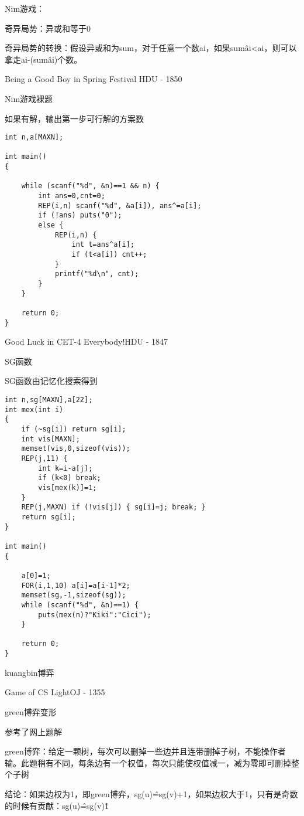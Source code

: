 Nim游戏：

奇异局势：异或和等于0

奇异局势的转换：假设异或和为sum，对于任意一个数ai，如果sum\^ai<ai，则可以拿走ai-(sum\^ai)个数。

Being a Good Boy in Spring Festival HDU - 1850

Nim游戏裸题

如果有解，输出第一步可行解的方案数

\begin{lstlisting}
int n,a[MAXN];

int main()
{

    while (scanf("%d", &n)==1 && n) {
        int ans=0,cnt=0;
        REP(i,n) scanf("%d", &a[i]), ans^=a[i];
        if (!ans) puts("0");
        else {
            REP(i,n) {
                int t=ans^a[i];
                if (t<a[i]) cnt++;
            }
            printf("%d\n", cnt);
        }
    }

    return 0;
}
\end{lstlisting}

Good Luck in CET-4 Everybody!HDU - 1847

SG函数

SG函数由记忆化搜索得到

\begin{lstlisting}
int n,sg[MAXN],a[22];
int mex(int i)
{
    if (~sg[i]) return sg[i];
    int vis[MAXN];
    memset(vis,0,sizeof(vis));
    REP(j,11) {
        int k=i-a[j];
        if (k<0) break;
        vis[mex(k)]=1;
    }
    REP(j,MAXN) if (!vis[j]) { sg[i]=j; break; }
    return sg[i];
}

int main()
{

    a[0]=1;
    FOR(i,1,10) a[i]=a[i-1]*2;
    memset(sg,-1,sizeof(sg));
    while (scanf("%d", &n)==1) {
        puts(mex(n)?"Kiki":"Cici");
    }

    return 0;
}
\end{lstlisting}

kuangbin博弈

Game of CS LightOJ - 1355

green博弈变形

参考了网上题解

green博弈：给定一颗树，每次可以删掉一些边并且连带删掉子树，不能操作者输。此题稍有不同，每条边有一个权值，每次只能使权值减一，减为零即可删掉整个子树

结论：如果边权为1，即green博弈，sg(u)\^=sg(v)+1，如果边权大于1，只有是奇数的时候有贡献：sg(u)\^=sg(v)\^1

